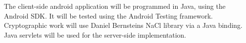 The client-side android application will be programmed in Java, using the Android SDK. It will be tested using the Android Testing framework. Cryptographic work will use Daniel Bernsteins NaCl library via a Java binding. Java servlets will be used for the server-side implementation.
